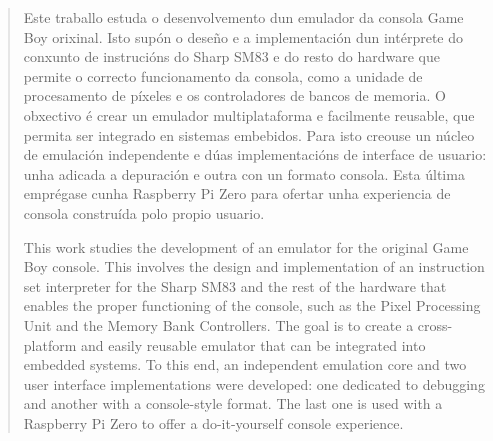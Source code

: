 
\pagestyle{empty}
\begin{abstract}
Este traballo estuda o desenvolvemento dun emulador da consola Game Boy orixinal.
Isto supón o deseño e a implementación dun intérprete do conxunto de instrucións do Sharp SM83
e do resto do hardware que permite o correcto funcionamento da consola,
como a unidade de procesamento de píxeles e os controladores de bancos de memoria.
O obxectivo é crear un emulador multiplataforma e facilmente reusable, que permita ser integrado en sistemas embebidos.
Para isto creouse un núcleo de emulación independente e
dúas implementacións de interface de usuario: unha adicada a depuración e outra con un formato consola.
Esta última emprégase cunha Raspberry Pi Zero para ofertar unha experiencia de consola construída polo propio usuario.


  \vspace*{25pt}
  \begin{segundoresumo}
  This work studies the development of an emulator for the original Game Boy console.
  This involves the design and implementation of an instruction set interpreter
  for the Sharp SM83 and the rest of the hardware that enables
  the proper functioning of the console,
  such as the Pixel Processing Unit and the Memory Bank Controllers.
  The goal is to create a cross-platform and easily reusable emulator
  that can be integrated into embedded systems. To this end,
  an independent emulation core and two user interface implementations were developed: 
  one dedicated to debugging and another with a console-style format.
  The last one is used with a Raspberry Pi Zero to offer a do-it-yourself console experience.
  \end{segundoresumo}
\vspace*{25pt}

\end{abstract}
\pagestyle{fancy}

